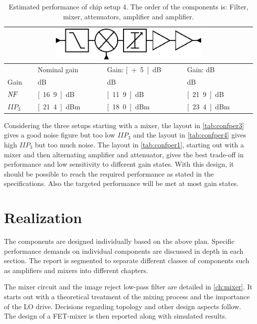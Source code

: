 		\begin{table}[hpt!]
			\caption[Estimated performance of chip setup 4.]{Estimated performance of chip setup 4. The order of the components is: Filter, mixer, attenuators, amplifier and amplifier.}
			\label{tab:confper4}
			\centering
			\begin{tabular}{ l l l l }
				\multicolumn{4}{c}{\includegraphics[width=0.6\textwidth]{fig/system/sys4}} \\\toprule
				& Nominal gain & Gain: \unit[+5]{dB} & Gain: \unit[-5]{dB} \\\midrule
				Gain & \unit[9]{dB} & \unit[14]{dB} & \unit[4]{dB} \\
				$\emph{NF}$ & \unit[16.9]{dB} & \unit[11.9]{dB} & \unit[21.9]{dB} \\
				$IIP_3$ & \unit[21.4]{dBm} & \unit[18.0]{dBm} & \unit[23.4]{dBm} \\\bottomrule
			\end{tabular}
		\end{table}

		Considering the three setups starting with a mixer, the layout in \autoref{tab:confper3} gives a good noise figure but too low $IIP_3$ and the layout in \autoref{tab:confper4} gives high $IIP_3$ but too much noise. The layout in \autoref{tab:confper1}, starting out with a mixer and then alternating amplifier and attenuator, gives the best trade-off in performance and low sensitivity to different gain states. With this design, it should be possible to reach the required performance as stated in the specifications. Also the targeted performance will be met at most gain states.

	\section{Realization}
		The components are designed individually based on the above plan. Specific performance demands on individual components are discussed in depth in each section. The report is segmented to separate different classes of components such as amplifiers and mixers into different chapters.

		The mixer circuit and the image reject low-pass filter are detailed in \autoref{ch:mixer}. It starts out with a theoretical treatment of the mixing process and the importance of the LO drive. Decisions regarding topology and other design aspects follow. The design of a FET-mixer is then reported along with simulated results.

